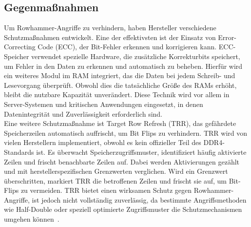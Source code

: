 \subsection{Gegenmaßnahmen}
\label{subsec:rowhammer_gegenmanahmen}
Um Rowhammer-Angriffe zu verhindern, haben Hersteller verschiedene Schutzmaßnahmen entwickelt.
Eine der effektivsten ist der Einsatz von Error-Correcting Code (ECC), der Bit-Fehler erkennen und korrigieren kann.
ECC-Speicher verwendet spezielle Hardware, die zusätzliche Korrekturbits speichert, um Fehler in den Daten zu erkennen und automatisch zu beheben.
Hierfür wird ein weiteres Modul im RAM integriert, das die Daten bei jedem Schreib- und Lesevorgang überprüft.
Obwohl dies die tatsächliche Größe des RAMs erhöht, bleibt die nutzbare Kapazität unverändert.
Diese Technik wird vor allem in Server-Systemen und kritischen Anwendungen eingesetzt, in denen Datenintegrität und Zuverlässigkeit erforderlich sind. \\
Eine weitere Schutzmaßnahme ist Target Row Refresh (TRR), das gefährdete Speicherzeilen automatisch auffrischt, um Bit Flips zu verhindern.
TRR wird von vielen Herstellern implementiert, obwohl es kein offizieller Teil des DDR4-Standards ist.
Es überwacht Speicherzugriffsmuster, identifiziert häufig aktivierte Zeilen und frischt benachbarte Zeilen auf.
Dabei werden Aktivierungen gezählt und mit herstellerspezifischen Grenzwerten verglichen.
Wird ein Grenzwert überschritten, markiert TRR die betroffenen Zeilen und frischt sie auf, um Bit-Flips zu vermeiden.
TRR bietet einen wirksamen Schutz gegen Rowhammer-Angriffe, ist jedoch nicht vollständig zuverlässig, da bestimmte Angriffsmethoden wie Half-Double oder speziell optimierte Zugriffsmuster die Schutzmechanismen umgehen können~\cite{jiang2021trrscope}.
